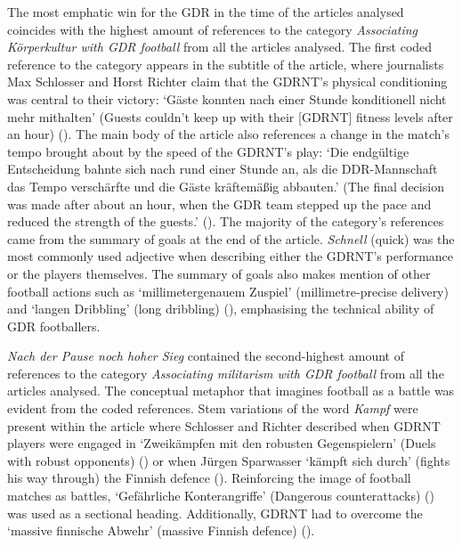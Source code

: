The most emphatic win for the GDR in the time of the articles analysed coincides with the highest amount of references to the category \textit{Associating Körperkultur with GDR football} from all the articles analysed. The first coded reference to the category appears in the subtitle of the article, where journalists Max Schlosser and Horst Richter claim that the GDRNT’s physical conditioning was central to their victory: ‘Gäste konnten nach einer Stunde konditionell nicht mehr mithalten’ (Guests couldn't keep up with their [GDRNT] fitness levels after an hour) (\cite{nd19721008}). The main body of the article also references a change in the match’s tempo brought about by the speed of the GDRNT’s play: ‘Die endgültige Entscheidung bahnte sich nach rund einer Stunde an, als die DDR-Mannschaft das Tempo verschärfte und die Gäste kräftemäßig abbauten.’ (The final decision was made after about an hour, when the GDR team stepped up the pace and reduced the strength of the guests.’ (\cite{nd19721008}). The majority of the category’s references came from the summary of goals at the end of the article. \textit{Schnell} (quick) was the most commonly used adjective when describing either the GDRNT’s performance or the players themselves. The summary of goals also makes mention of other football actions such as ‘millimetergenauem Zuspiel’ (millimetre-precise delivery) and ‘langen Dribbling’ (long dribbling) (\cite{nd19721008}), emphasising the technical ability of GDR footballers.

\textit{Nach der Pause noch hoher Sieg} contained the second-highest amount of references to the category \textit{Associating militarism with GDR football} from all the articles analysed. The conceptual metaphor that imagines football as a battle was evident from the coded references. Stem variations of the word \textit{Kampf} were present within the article where Schlosser and Richter described when GDRNT players were engaged in ‘Zweikämpfen mit den robusten Gegenspielern’ (Duels with robust opponents) (\cite{nd19721008}) or when Jürgen Sparwasser ‘kämpft sich durch’ (fights his way through) the Finnish defence (\cite{nd19721008}). Reinforcing the image of football matches as battles, ‘Gefährliche Konterangriffe’ (Dangerous counterattacks) (\cite{nd19721008}) was used as a sectional heading. Additionally, GDRNT had to overcome the ‘massive finnische Abwehr’ (massive Finnish defence) (\cite{nd19721008}).

